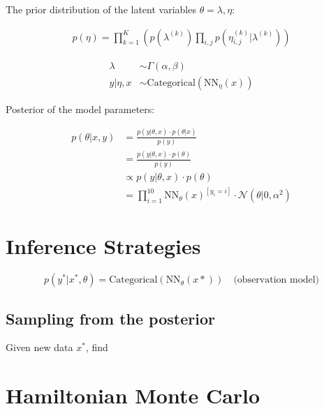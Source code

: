 The prior distribution of the latent variables $\theta = \lambda, \eta$: 


\begin{align*}
    p(\eta) =  \prod_{k=1}^K \left( p(\lambda^{(k)}) \prod_{i,j} p(\eta_{i,j}^{(k)}|\lambda^{(k)})\right)
\end{align*}



\begin{align*}
    \lambda &\sim \Gamma (\alpha, \beta)\\
    y | \eta, x &\sim \text{Categorical}(\text{NN}_\eta(x))
\end{align*}

Posterior of the model parameters:
    
\begin{align*}
    p(\theta | x, y) &= \frac{p(y |\theta, x) \cdot p(\theta|x)}{p(y) } \\
                     &= \frac{p(y |\theta, x) \cdot p(\theta)}{p(y) } \\
                     &\propto p(y |\theta, x) \cdot p(\theta) \\
                     &=\prod_{i=1}^{10}\text{NN}_\theta(x)^{[ y_i = i]} \cdot \mathcal{N}(\theta | 0, \alpha^2)
\end{align*}



\section{Inference Strategies}

$$
p(y^\ast | x^\ast, \theta ) = \text{Categorical}(\text{NN}_\theta(x\ast)) \quad \text{(observation model)}
$$

\subsection{Sampling from the posterior}

Given new data $x^\ast$, find 

\section{Hamiltonian Monte Carlo}


